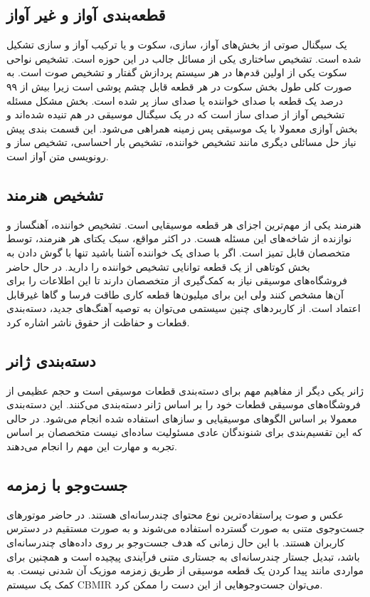 \subsection{قطعه‌بندی آواز و غیر آواز}
یک سیگنال صوتی از بخش‌های آواز، سازی، سکوت و یا ترکیب آواز و سازی تشکیل شده است.
تشخیص ساختاری یکی از مسائل جالب در این حوزه است. تشخیص نواحی سکوت یکی از اولین
قدم‌ها در هر سیستم پردازش گفتار و تشخیص صوت است. به صورت کلی طول بخش سکوت در هر
قطعه قابل چشم پوشی است زیرا بیش از ۹۹ درصد یک قطعه با صدای خواننده یا صدای ساز
پر شده است. بخش مشکل مسئله تشخیص آواز از صدای ساز است که در یک سیگنال موسیقی در
هم تنیده شده‌اند و بخش آوازی معمولا با یک موسیقی پس زمینه همراهی می‌شود. این
قسمت بندی پیش نیاز حل مسائلی دیگری مانند تشخیص خواننده، تشخیص بار احساسی، تشخیص
ساز و رونویسی متن آواز است.

\subsection{تشخیص هنرمند}
هنرمند یکی از مهم‌ترین اجزای هر قطعه موسیقایی است. تشخیص خواننده، آهنگساز و
نوازنده از شاخه‌های این مسئله هست. در اکثر مواقع، سبک یکتای هر هنرمند، توسط
متخصصان قابل تمیز است. اگر با صدای یک خواننده آشنا باشید تنها با گوش دادن به بخش
کوتاهی از یک قطعه توانایی تشخیص خواننده را دارید. در حال حاضر فروشگاه‌های موسیقی
نیاز به کمک‌گیری از متخصصان دارند تا این اطلاعات را برای آن‌ها مشخص کنند ولی این
برای میلیون‌ها قطعه کاری طاقت فرسا و گاها غیرقابل اعتماد است. از کاربردهای چنین
سیستمی می‌توان به توصیه آهنگ‌های جدید، دسته‌بندی قطعات و حفاظت از حقوق ناشر
اشاره کرد.

\subsection{دسته‌بندی ژانر}
ژانر یکی دیگر از مفاهیم مهم برای دسته‌بندی قطعات موسیقی است و حجم عظیمی از
فروشگاه‌های موسیقی قطعات خود را بر اساس ژانر دسته‌بندی می‌کنند. این دسته‌بندی
معمولا بر اساس الگوهای موسیقیایی و سازهای استفاده شده انجام می‌شود. در حالی که
این تقسیم‌بندی برای شنوندگان عادی مسئولیت ساده‌ای نیست متخصصان بر اساس تجربه و
مهارت این مهم را انجام می‌دهند.

\subsection{جست‌وجو با زمزمه}
عکس و صوت پراستفاده‌ترین نوع محتوای چندرسانه‌ای هستند. در حاضر موتورهای جست‌وجوی
متنی به صورت گسترده استفاده می‌شوند و به صورت مستقیم در دسترس کاربران هستند. با
این حال زمانی که هدف جست‌وجو بر روی داده‌های چندرسانه‌ای باشد، تبدیل جستار
چندرسانه‌ای به جستاری متنی فرآیندی پیچیده است و همچنین برای مواردی مانند پیدا
کردن یک قطعه موسیقی از طریق زمزمه موزیک آن شدنی نیست. به کمک یک سیستم
\gls{CBMIR} می‌توان جست‌وجوهایی از این دست را ممکن کرد.

